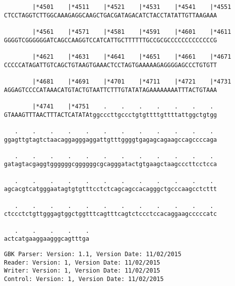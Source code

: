 \documentclass{article}
\begin{document}
\begin{Verbatim}
        |*4501    |*4511    |*4521    |*4531    |*4541    |*4551
CTCCTAGGTCTTGGCAAAGAGGCAAGCTGACGATAGACATCTACCTATATTGTTAAGAAA
  
        |*4561    |*4571    |*4581    |*4591    |*4601    |*4611
GGGGTCGGGGGGATCAGCCAAGGTCCATCATTGCTTTTTTGCCGCGCCCCCCCCCCCCCG
  
        |*4621    |*4631    |*4641    |*4651    |*4661    |*4671
CCCCCATAGATTGTCAGCTGTAAGTGAAACTCCTAGTGAAAAAGAGGGGAGCCCTGTGTT
  
        |*4681    |*4691    |*4701    |*4711    |*4721    |*4731
AGGAGTCCCCATAAACATGTACTGTAATTCTTTGTATATAGAAAAAAAATTTACTGTAAA
  
        |*4741    |*4751    .    .    .    .    .    .    . 
GTAAAGTTTAACTTTACTCATATAtggcccttgccctgtgttttgttttattggctgtgg
  
   .    .    .    .    .    .    .    .    .    .    .    . 
ggagttgtagtctaacaggagggaggattgtttggggtgagagcagaagccagccccaga
  
   .    .    .    .    .    .    .    .    .    .    .    . 
gatagtacgaggtggggggcggggggcgcagggatactgtgaagctaagcccttcctcca
  
   .    .    .    .    .    .    .    .    .    .    .    . 
agcacgtcatgggaatagtgtgtttcctctcagcagccacagggctgcccaagcctcttt
  
   .    .    .    .    .    .    .    .    .    .    .    . 
ctccctctgttgggagtggctggtttcagtttcagtctccctccacaggaagcccccatc
  
   .    .    .    .    .
actcatgaaggaagggcagtttga
\end{Verbatim}
\newpage
\begin{Verbatim}
GBK Parser: Version: 1.1, Version Date: 11/02/2015
Reader: Version: 1, Version Date: 11/02/2015
Writer: Version: 1, Version Date: 11/02/2015
Control: Version: 1, Version Date: 11/02/2015
\end{Verbatim}
\end{document}
